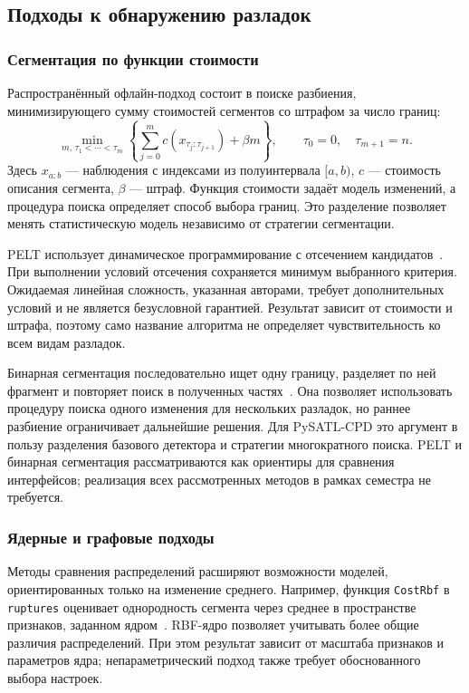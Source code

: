 \subsection{Подходы к обнаружению разладок}

\subsubsection{Сегментация по функции стоимости}

Распространённый офлайн-подход состоит в поиске разбиения,
минимизирующего сумму стоимостей сегментов со штрафом за число границ:
\[
 \min_{m,\,\tau_1<\cdots<\tau_m}
 \left\{\sum_{j=0}^{m}c(x_{\tau_j:\tau_{j+1}})+\beta m\right\},
 \qquad \tau_0=0,\quad\tau_{m+1}=n.
\]
Здесь $x_{a:b}$ --- наблюдения с индексами из полуинтервала $[a,b)$,
$c$ --- стоимость описания сегмента, $\beta$ --- штраф.
Функция стоимости задаёт модель изменений, а процедура поиска
определяет способ выбора границ. Это разделение позволяет менять
статистическую модель независимо от стратегии сегментации.

PELT использует динамическое программирование с отсечением
кандидатов~\cite{killick2012}. При выполнении условий отсечения
сохраняется минимум выбранного критерия. Ожидаемая линейная сложность,
указанная авторами, требует дополнительных условий и не является
безусловной гарантией. Результат зависит от стоимости и штрафа,
поэтому само название алгоритма не определяет чувствительность
ко всем видам разладок.

Бинарная сегментация последовательно ищет одну границу, разделяет
по ней фрагмент и повторяет поиск в полученных частях~\cite{binseg}.
Она позволяет использовать процедуру поиска одного изменения
для нескольких разладок, но раннее разбиение ограничивает дальнейшие
решения. Для PySATL-CPD это аргумент в пользу разделения базового
детектора и стратегии многократного поиска. PELT и бинарная
сегментация рассматриваются как ориентиры для сравнения интерфейсов;
реализация всех рассмотренных методов в рамках семестра не требуется.

\subsubsection{Ядерные и графовые подходы}

Методы сравнения распределений расширяют возможности моделей,
ориентированных только на изменение среднего. Например, функция
\texttt{CostRbf} в \texttt{ruptures} оценивает однородность сегмента
через среднее в пространстве признаков, заданном ядром~\cite{kernel}.
RBF-ядро позволяет учитывать более общие различия распределений.
При этом результат зависит от масштаба признаков и параметров ядра;
непараметрический подход также требует обоснованного выбора настроек.

